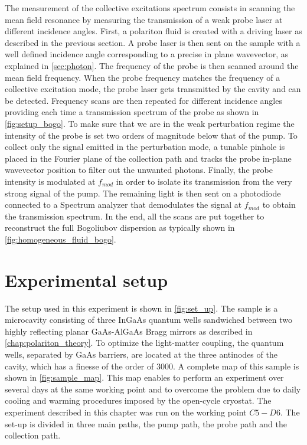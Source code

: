 The measurement of the collective excitations spectrum consists in scanning the mean field resonance by measuring the transmission of a weak probe laser at different incidence angles. First, a polariton fluid is created with a driving laser as described in the previous section. A probe laser is then sent on the sample with a well defined incidence angle corresponding to a precise in plane wavevector, as explained in \autoref{sec:photon}. The frequency of 
the probe is then scanned around the mean field frequency. When the probe frequency matches the frequency of a collective excitation mode, the probe laser gets transmitted by the cavity and can be detected. Frequency scans are then repeated for different incidence angles providing each time a transmission spectrum of the probe as shown in \autoref{fig:setup_bogo}. 
To make sure that we are in the weak perturbation regime the intensity of the probe is set two orders of magnitude below that of the pump. To collect only the signal emitted in the perturbation mode, a tunable pinhole is placed in the Fourier plane of the collection path and tracks the probe in-plane wavevector position to filter out the unwanted photons. Finally, the probe intensity is modulated at $f_{mod}$ in order to isolate its transmission from the very strong signal of the pump. The remaining light is then sent on
a photodiode connected to a Spectrum analyzer that demodulates the signal at $f_{mod}$ to obtain the transmission spectrum. In the end, all the scans are put together to reconstruct the full Bogoliubov dispersion as typically shown in \autoref{fig:homogeneous_fluid_bogo}.

\section{Experimental setup}
The setup used in this experiment is shown in \autoref{fig:set_up}. The sample is a microcavity consisting of three InGaAs quantum wells sandwiched between two highly reflecting planar GaAs-AlGaAs Bragg mirrors as described in \autoref{chap:polariton_theory}.
To optimize the light-matter coupling, the quantum wells, separated by GaAs barriers, are located at the three antinodes of the cavity, which has a finesse of the order of 3000. A complete map of this sample 
is shown in \autoref{fig:sample_map}. This map enables to perform an experiment over several days at the same working point and to overcome the problem due to daily cooling and warming procedures imposed by the open-cycle cryostat.
 The experiment described in this chapter was run on the working point $C5-D6$.
 The set-up is divided in three main paths, the pump path, the probe path and the collection path.



